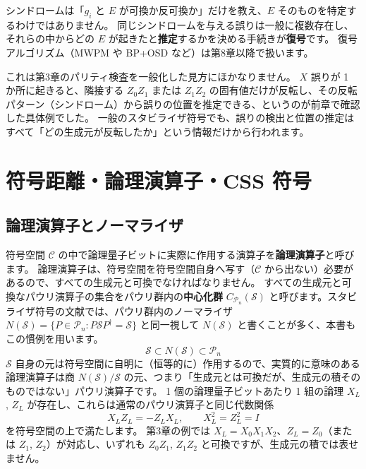\begin{notebox}
  シンドロームは「$g_i$ と $E$ が可換か反可換か」だけを教え、$E$ そのものを特定するわけではありません。
  同じシンドロームを与える誤りは一般に複数存在し、それらの中からどの $E$ が起きたと\textbf{推定}するかを決める手続きが\textbf{復号}です。
  復号アルゴリズム（MWPM や BP+OSD など）は第8章以降で扱います。
\end{notebox}

これは第3章のパリティ検査を一般化した見方にほかなりません。
$X$ 誤りが 1 か所に起きると、隣接する $Z_0Z_1$ または $Z_1Z_2$ の固有値だけが反転し、その反転パターン（シンドローム）から誤りの位置を推定できる、というのが前章で確認した具体例でした。
一般のスタビライザ符号でも、誤りの検出と位置の推定はすべて「どの生成元が反転したか」という情報だけから行われます。

\section{符号距離・論理演算子・CSS 符号}\label{sec:css}

\subsection{論理演算子とノーマライザ}

符号空間 $\mathcal{C}$ の中で論理量子ビットに実際に作用する演算子を\textbf{論理演算子}と呼びます。
論理演算子は、符号空間を符号空間自身へ写す（$\mathcal{C}$ から出ない）必要があるので、すべての生成元と可換でなければなりません。
すべての生成元と可換なパウリ演算子の集合をパウリ群内の\textbf{中心化群} $C_{\mathcal P_n}(\mathcal{S})$ と呼びます。スタビライザ符号の文献では、パウリ群内のノーマライザ $N(\mathcal{S})=\{P\in\mathcal P_n:P\mathcal SP^\dagger=\mathcal S\}$ と同一視して $N(\mathcal S)$ と書くことが多く、本書もこの慣例を用います\cite{gottesman1997stabilizer}。
\begin{equation}
  \mathcal{S} \subset N(\mathcal{S}) \subset \mathcal{P}_n
\end{equation}
$\mathcal{S}$ 自身の元は符号空間に自明に（恒等的に）作用するので、実質的に意味のある論理演算子は商 $N(\mathcal{S})/\mathcal{S}$ の元、つまり「生成元とは可換だが、生成元の積そのものではない」パウリ演算子です。
1 個の論理量子ビットあたり 1 組の論理 $X_L$, $Z_L$ が存在し、これらは通常のパウリ演算子と同じ代数関係
\begin{equation}
  X_L Z_L = -Z_L X_L, \qquad X_L^2 = Z_L^2 = I
\end{equation}
を符号空間の上で満たします。
第3章の例では $X_L = X_0X_1X_2$、$Z_L = Z_0$（または $Z_1$, $Z_2$）が対応し、いずれも $Z_0Z_1$, $Z_1Z_2$ と可換ですが、生成元の積では表せません。

